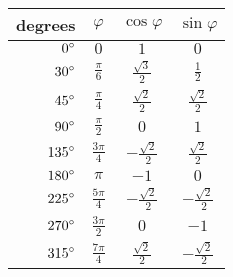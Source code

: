 \begin{tabular}{rccc}                                                               \toprule
degrees        & $\varphi$        & $\cos\varphi$         & $\sin\varphi$         \\\midrule
${0}^{\circ}$   & $0$              & $1$                   & $0$                   \\[6pt]
${30}^{\circ}$  & $\frac{\pi}{6}$  & $\frac{\sqrt{3}}{2}$  & $\frac{1}{2}$         \\[6pt]
${45}^{\circ}$  & $\frac{\pi}{4}$  & $\frac{\sqrt{2}}{2}$  & $\frac{\sqrt{2}}{2}$  \\[6pt]
${90}^{\circ}$  & $\frac{\pi}{2}$  & $0$                   & $1$                   \\[6pt]
${135}^{\circ}$ & $\frac{3\pi}{4}$ & $-\frac{\sqrt{2}}{2}$ & $\frac{\sqrt{2}}{2}$  \\[6pt]
${180}^{\circ}$ & $\pi$            & $-1$                  & $0$                   \\[6pt]
${225}^{\circ}$ & $\frac{5\pi}{4}$ & $-\frac{\sqrt{2}}{2}$ & $-\frac{\sqrt{2}}{2}$ \\[6pt]
${270}^{\circ}$ & $\frac{3\pi}{2}$ & $0$                   & $-1$                  \\[6pt]
${315}^{\circ}$ & $\frac{7\pi}{4}$ & $\frac{\sqrt{2}}{2}$  & $-\frac{\sqrt{2}}{2}$ \\\bottomrule
\end{tabular}
